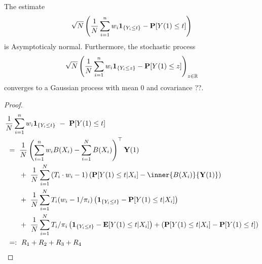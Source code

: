\begin{theorem}
  The estimate 
  \begin{gather}
    \sqrt{N}
    \left( 
  \frac{1}{N}
    \sum_{i=1}^{n} 
    w_i
    \mathbf{1}
    _{\left\{ Y_i\le t \right\}}
    -
    \P[Y(1)\le t]
    \right)
  \end{gather}
  is Asymptoticaly normal.
  Furthermore, the stochastic process 
  \begin{gather}
    \sqrt{N}
    \left( 
  \frac{1}{N}
    \sum_{i=1}^{n} 
    w_i
    \mathbf{1}
    _{\left\{ Y_i\le z \right\}}
    -
    \P[Y(1)\le z]
    \right)
    _{z\in\R}
  \end{gather}
  converges to a Gaussian process with mean 0 and covariance ??.
\end{theorem}
\begin{proof}
\begin{align*}
  &
    \frac{1}{N}
    \sum_{i=1}^{n} 
    w_i
    \mathbf{1}_{\left\{ Y_i \le t \right\}}
    \ 
    -
    \ 
    \P[Y(1)\le t]
    \\
  &
  \ 
  =
  \ 
  \frac{1}{N}
  \left( 
    \sum_{i=1}^{n} 
    w_i
    B(X_i)
    -
    \sum_{i=1}^{N} 
    B(X_i)
  \right)
  ^\top
     \mathbf{Y}(1) 
  \\
  &
  \qquad
  +
  \ 
  \frac{1}{N}
    \sum_{i=1}^{N} 
    \left( T_i\cdot w_i -1 \right)
    \left( 
    \P[Y(1)\le t| X_i]
    -
    \inner
    {B(X_i)}
    { \mathbf{Y}(1) }
    \right)
  \\
  &
  \qquad
  +
  \ 
  \frac{1}{N}
    \sum_{i=1}^{N} 
    T_i
    (
    w_i 
    -
    1/\pi_i
    )
    \left( 
    \mathbf{1}_{\left\{ Y_i \le t \right\}}
    -
    \P[Y(1)\le t| X_i]
    \right)
  \\
  &
  \qquad
  +
  \ 
  \frac{1}{N}
    \sum_{i=1}^{N} 
    T_i
    /\pi_i
    \left( 
    \mathbf{1}_{\left\{ Y_i \le t \right\}}
    -
    \E[Y(1)\le t| X_i]
    \right)
    +
    \left( 
    \P[Y(1)\le t| X_i]
    -
    \P[Y(1)\le t]
    \right)
  \\
  &
  \ 
  =:
  \ 
  R_1
  +
  R_2
  +
  R_3
  +
  R_4
  \end{align*}


\end{proof}
